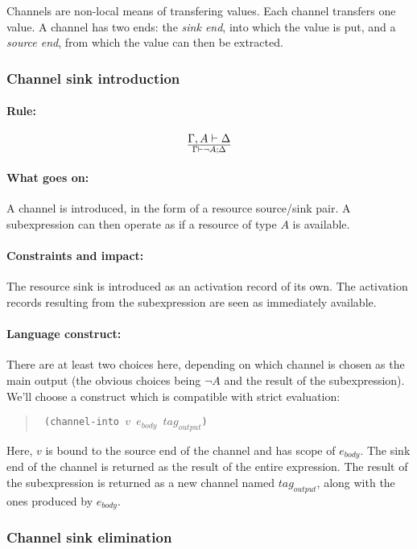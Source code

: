 \documentclass[a4paper]{article}
\begin{document}
Channels are non-local means of transfering values.
Each channel transfers one value.
A channel has two ends: the \emph{sink end}, into which the value is
put, and a \emph{source end}, from which the value can then be
extracted.

\subsubsection{Channel sink introduction}

\paragraph{Rule:}
$$
{
  \Gamma, A \vdash \Delta
}\over{
  \Gamma \vdash \lnot A; \Delta
}
$$

\paragraph{What goes on:} A channel is introduced, in the form of a
resource source/sink pair. A subexpression can then operate as if a
resource of type $A$ is available.

\paragraph{Constraints and impact:} The resource sink is introduced as
an activation record of its own. The activation records resulting from
the subexpression are seen as immediately available.

\paragraph{Language construct:}
There are at least two choices here, depending on which channel is
chosen as the main output (the obvious choices being $\lnot A$ and the
result of the subexpression).
%
We'll choose a construct which is compatible with strict evaluation:
\begin{quote}\tt
  (channel-into $v$ $e_{body}$ $\mathit{tag}_{output}$)
\end{quote}
Here, $v$ is bound to the source end of the channel and has scope of
$e_{body}$.  The sink end of the channel is returned as the result of
the entire expression.
The result of the subexpression is returned as a new channel named
$\mathit{tag}_{output}$, along with the ones produced by $e_{body}$.

\subsubsection{Channel sink elimination}
\end{document}
